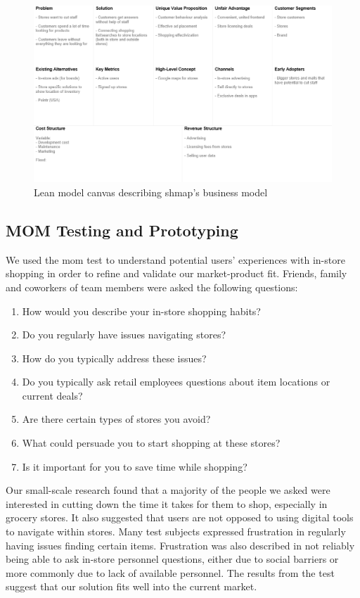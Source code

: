 \documentclass[titlepage]{article}
\def\companyName{shmap}
\begin{document}
\begin{figure}[ht]
    \centering
    \includegraphics[width=1\textwidth]{lean model canvas.png}
    \caption{Lean model canvas describing \companyName's business model}
    \label{fig:lean-model-canvas}
\end{figure}

\subsection{MOM Testing and Prototyping} 

We used the mom test to understand potential users' experiences with in-store shopping in order to refine and validate our market-product fit. 
Friends, family and coworkers of team members were asked the following questions:
\begin{enumerate}
    \item How would you describe your in-store shopping habits?
    \item Do you regularly have issues navigating stores?
    \item How do you typically address these issues?
    \item Do you typically ask retail employees questions about item locations or current deals?
    \item Are there certain types of stores you avoid?
    \item What could persuade you to start shopping at these stores?
    \item Is it important for you to save time while shopping?
\end{enumerate}
Our small-scale research found that a majority of the people we asked were interested in cutting down the time it takes for them to shop, especially in grocery stores. It also suggested that users are not opposed to using digital tools to navigate within stores.
Many test subjects expressed frustration in regularly having issues finding certain items. Frustration was also described in not reliably being able to ask in-store personnel questions, either due to social barriers or more commonly due to lack of available personnel. 
The results from the test suggest that our solution fits well into the current market.
\end{document}
